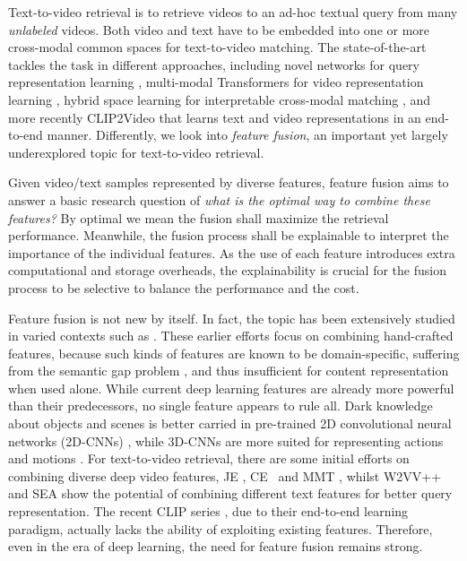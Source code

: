 Text-to-video retrieval is to retrieve videos \wrt to an ad-hoc textual query from many \emph{unlabeled} videos. Both video and text have to be embedded into one or more cross-modal common spaces for  text-to-video matching. The state-of-the-art tackles the task in different approaches, including novel networks for query representation learning \cite{wray2019fine_r1,sigir20-yang-vr}, multi-modal Transformers for video representation learning \cite{gabeur2020multi,bain2021frozen_r6}, hybrid space learning for interpretable cross-modal matching \cite{Dong2021DE_hybrid,WuN2020}, and more recently CLIP2Video \cite{fang2021clip2video} that learns text and video representations in an end-to-end manner. Differently, we look into \emph{feature fusion}, an important yet largely underexplored topic for text-to-video retrieval.

Given video/text samples represented by diverse features, feature fusion aims to answer a basic research question of \emph{what is the optimal way to combine these features?} By optimal we mean the fusion shall maximize the retrieval performance. Meanwhile, the fusion process shall be explainable to interpret the importance of the individual features. As the use of each feature introduces extra computational and storage overheads, the explainability is crucial for the fusion process to be selective to balance the performance and the cost.

Feature fusion is not new by itself. In fact, the topic has been extensively studied in varied contexts such as . These earlier efforts focus on combining hand-crafted features, because such kinds of features are known to be domain-specific, suffering from the semantic gap problem \cite{pami00-cbir}, and thus insufficient for content representation when used alone. While current deep learning features are already more powerful than their predecessors, no single feature appears to rule all. Dark knowledge about objects and scenes is better carried in pre-trained 2D convolutional neural networks (2D-CNNs) \cite{2021clip_icml}, while 3D-CNNs are more suited for representing actions and motions \cite{ircsn}. For text-to-video retrieval, there are some initial efforts on combining diverse deep video features, \eg JE \cite{mithun2018learning_r2,mithun2019joint_r3}, CE~\cite{liu2019use} and MMT \cite{gabeur2020multi}, whilst W2VV++ \cite{LiXirong2019W2VVPP} and SEA \cite{LiXirong2020SEA} show the potential of combining different text features for better query representation. The recent CLIP series \cite{luo2021clip4clip,fang2021clip2video}, due to their end-to-end learning paradigm, actually lacks the ability of exploiting existing features. Therefore, even in the era of deep learning, the need for feature fusion remains strong.

